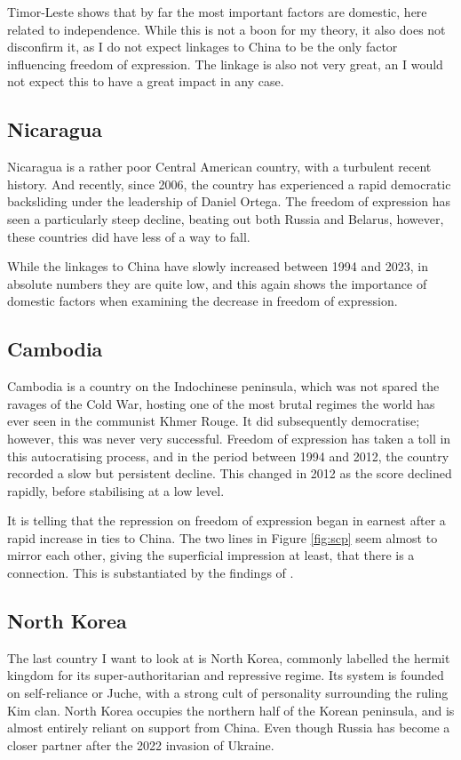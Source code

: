 Timor-Leste shows that by far the most important factors are domestic, here related to independence. While this is not a boon for my theory, it also does not disconfirm it, as I do not expect linkages to China to be the only factor influencing freedom of expression. The linkage is also not very great, an I would not expect this to have a great impact in any case.

\subsection{Nicaragua}
Nicaragua is a rather poor Central American country, with a turbulent recent history. And recently, since 2006, the country has experienced a rapid democratic backsliding under the leadership of Daniel Ortega. The freedom of expression has seen a particularly steep decline, beating out both Russia and Belarus, however, these countries did have less of a way to fall.

While the linkages to China have slowly increased between 1994 and 2023, in absolute numbers they are quite low, and this again shows the importance of domestic factors when examining the decrease in freedom of expression.

\subsection{Cambodia}
Cambodia is a country on the Indochinese peninsula, which was not spared the ravages of the Cold War, hosting one of the most brutal regimes the world has ever seen in the communist Khmer Rouge. It did subsequently democratise; however, this was never very successful. Freedom of expression has taken a toll in this autocratising process, and in the period between 1994 and 2012, the country recorded a slow but persistent decline. This changed in 2012 as the score declined rapidly, before stabilising at a low level.

It is telling that the repression on freedom of expression began in earnest after a rapid increase in ties to China. The two lines in Figure \ref{fig:scp} seem almost to mirror each other, giving the superficial impression at least, that there is a connection. This is substantiated by the findings of \citet{loughlin_chinese_2021}.

\subsection{North Korea}
The last country I want to look at is North Korea, commonly labelled the hermit kingdom for its super-authoritarian and repressive regime. Its system is founded on self-reliance or Juche, with a strong cult of personality surrounding the ruling Kim clan. North Korea occupies the northern half of the Korean peninsula, and is almost entirely reliant on support from China. Even though Russia has become a closer partner after the 2022 invasion of Ukraine. 

